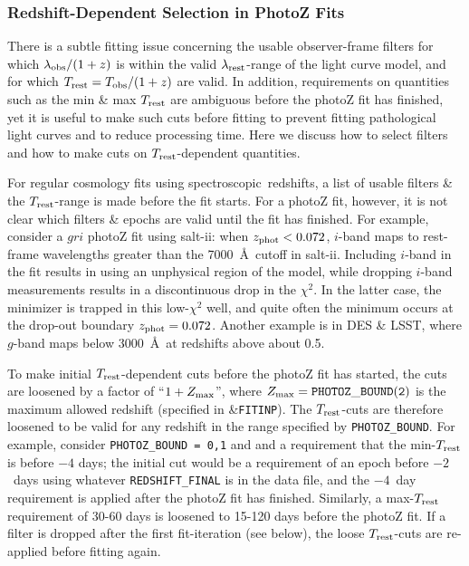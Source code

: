 \documentclass[12pt]{article}
\newcommand{\Tobs}{T_{\rm obs}}
\newcommand{\Trest}{T_{\rm rest}}
\newcommand{\SALTII}{{\sc salt-ii}}
\newcommand{\Zphot}{z_{\rm phot}}
\newcommand{\spec}{spectroscopic}
\newcommand{\lamobs}{\lambda_{\rm obs}}
\newcommand{\lamrest}{\lambda_{\rm rest}}
\newcommand{\zmax}{Z_{\rm max}}
\begin{document}
   \clearpage
   \subsubsection{Redshift-Dependent Selection in PhotoZ Fits}
   \label{sss:dropfilter_photoz}


There is a subtle fitting issue concerning the usable
observer-frame filters for which $\lamobs/(1+z)$ is within 
the valid $\lamrest$-range of the light curve model,
and for which $\Trest = \Tobs/(1+z)$ are valid.
In addition, requirements on quantities such as
the min \& max $\Trest$ are ambiguous before the 
photoZ fit has finished, yet it is useful
to make such cuts before fitting to prevent fitting
pathological light curves and to reduce processing time. 
Here we discuss how to select filters and how to make cuts 
on $\Trest$-dependent quantities.


For regular cosmology fits using \spec\ redshifts,
a list of usable filters \& the $\Trest$-range 
is made before the fit starts. 
For a photoZ fit, however, it is not clear which filters \& epochs
are valid until the fit has finished. 
For example, consider a $gri$ photoZ fit using \SALTII: 
when $\Zphot < 0.072$, $i$-band maps to rest-frame wavelengths 
greater than the 7000~\AA\ cutoff in \SALTII. Including $i$-band
in the fit results in using an unphysical region of the model,
while dropping $i$-band measurements results in a discontinuous
drop in the $\chi^2$. In the latter case, the minimizer is trapped
in this low-$\chi^2$ well, and quite often the minimum occurs
at the drop-out boundary $\Zphot = 0.072$.
Another example is in DES \& LSST,
where $g$-band maps below 3000~\AA\
at redshifts above about 0.5.


To make initial $\Trest$-dependent cuts before the photoZ
fit has started, the cuts are loosened by a factor of
``$1+\zmax$'', where $\zmax= {\tt PHOTOZ\_BOUND(2)}$ is
the maximum allowed redshift (specified in \&{\tt FITINP}).
The $\Trest$-cuts are therefore loosened to be valid
for any redshift in the range specified by {\tt PHOTOZ\_BOUND}.
For example, consider {\tt PHOTOZ\_BOUND = 0,1} and 
and a requirement that the min-$\Trest$ is before $-4$ days;
the initial cut would be a requirement of an epoch before
$-2$~days using whatever {\tt REDSHIFT\_FINAL} is in the 
data file, and the $-4$~day requirement is applied after
the photoZ fit has finished.
Similarly, a max-$\Trest$ requirement of 30-60 days is loosened 
to 15-120 days before the photoZ fit.
If a filter is dropped after the first fit-iteration (see below), 
the loose $\Trest$-cuts are re-applied before fitting again.
\end{document}

